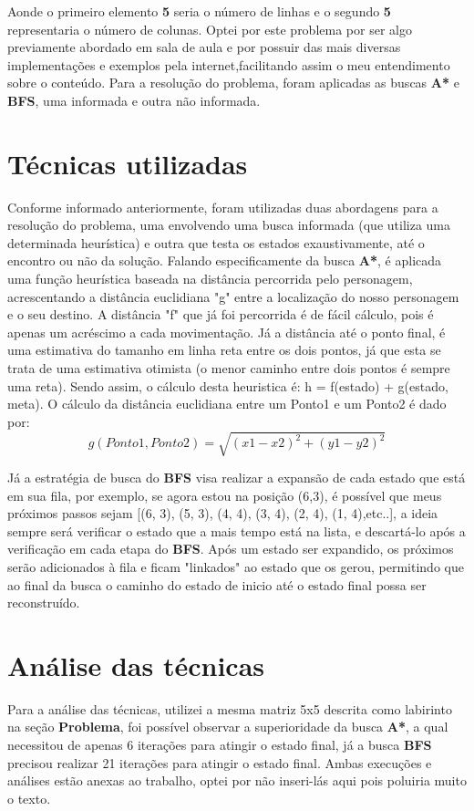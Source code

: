 \documentclass[12pt]{article}
\begin{document}
Aonde o primeiro elemento \textbf{5} seria o número de linhas e o segundo \textbf{5} representaria o número de colunas.
Optei por este problema por ser algo previamente abordado em sala de aula e por possuir das mais diversas implementações e exemplos pela internet,facilitando assim o meu entendimento sobre o conteúdo. Para a resolução do problema, foram aplicadas as buscas \textbf{A*}  e \textbf{BFS}, uma informada e outra não informada.

\section{Técnicas utilizadas}
Conforme informado anteriormente, foram utilizadas duas abordagens para a resolução do problema, uma envolvendo uma busca informada (que utiliza uma determinada heurística) e outra que testa os estados exaustivamente, até o encontro ou não da solução.
Falando especificamente da busca \textbf{A*}, é aplicada uma função heurística baseada na distância percorrida pelo personagem, acrescentando a distância euclidiana "g" entre a localização do nosso personagem e o seu destino. A distância "f" que já foi percorrida é de fácil cálculo, pois é apenas um acréscimo a cada movimentação. Já a distância até o ponto final, é uma estimativa do tamanho em linha reta entre os dois pontos, já que esta se trata de uma estimativa otimista (o menor caminho entre dois pontos é sempre uma reta). Sendo assim, o cálculo desta heuristica é: h = f(estado) + g(estado, meta).
O cálculo da distância euclidiana entre um Ponto1 e um Ponto2 é dado por: \begin{equation}
    g(Ponto1,Ponto2) = \sqrt{(x1-x2)^2 + (y1-y2)^2}
\end{equation}

Já a estratégia de busca do \textbf{BFS} visa realizar a expansão de cada estado que está em sua fila, por exemplo, se agora estou na posição (6,3), é possível que meus próximos passos sejam [(6, 3), (5, 3), (4, 4), (3, 4), (2, 4), (1, 4),etc..], a ideia sempre será verificar o estado que a mais tempo está na lista, e descartá-lo após a verificação em cada etapa do \textbf{BFS}. Após um estado ser expandido, os próximos serão adicionados à fila e ficam "linkados" ao estado que os gerou, permitindo que ao final da busca o caminho do estado de inicio até o estado final possa ser reconstruído.

\section{Análise das técnicas}
Para a análise das técnicas, utilizei a mesma matriz 5x5 descrita como labirinto na seção \textbf{Problema}, foi possível observar a superioridade da busca \textbf{A*}, a qual necessitou de apenas 6 iterações para atingir o estado final, já a busca \textbf{BFS} precisou realizar 21 iterações para atingir o estado final. Ambas execuções e análises estão anexas ao trabalho, optei por não inseri-lás aqui pois poluiria muito o texto.
\end{document}
